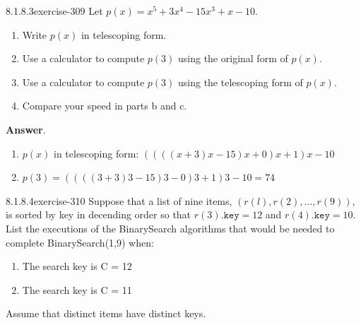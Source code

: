 \documentclass[twoside,10pt,]{book}
\numberwithin{equation}{section}
\begin{document}
\begin{divisionsolution}{8.1.8.3}{}{exercise-309}%
\hypertarget{p-2568}{}%
Let \(p(x) = x^5+ 3x^4 - 15x^3 + x - 10\).%
\par
\hypertarget{p-2569}{}%
\leavevmode%
\begin{enumerate}[label=(\alph*)]
\item\hypertarget{li-1282}{}\hypertarget{p-2570}{}%
Write \(p(x)\) in telescoping form.%
\item\hypertarget{li-1283}{}\hypertarget{p-2571}{}%
Use a calculator to compute \(p(3)\) using the original form of \(p(x)\).%
\item\hypertarget{li-1284}{}\hypertarget{p-2572}{}%
Use a calculator to compute \(p(3)\) using the telescoping form of \(p(x)\).%
\item\hypertarget{li-1285}{}\hypertarget{p-2573}{}%
Compare your speed in parts b and c.%
\end{enumerate}
%
\par\smallskip%
\noindent\textbf{Answer}.\quad%
\hypertarget{p-2574}{}%
\leavevmode%
\begin{enumerate}[label=(\alph*)]
\item\hypertarget{li-1286}{}\hypertarget{p-2575}{}%
\(p(x)\) in telescoping form: \(((((x+3)x-15)x+0)x+1)x-10\)%
\item\hypertarget{li-1287}{}\hypertarget{p-2576}{}%
\(p(3)=((((3+3)3-15)3-0)3+1)3-10=74\)%
\end{enumerate}
%
\end{divisionsolution}%
\begin{divisionsolution}{8.1.8.4}{}{exercise-310}%
\hypertarget{p-2577}{}%
Suppose that a list of nine items, \((r(l), r(2), . . . , r(9))\), is sorted by key in decending order so that \(r(3).\texttt{key} = 12\) and \(r(4).\texttt{key} = 10\). List the executions of the BinarySearch algorithms that would be needed to complete BinarySearch(1,9) when:\leavevmode%
\begin{multicols}{2}
\begin{enumerate}[label=(\alph*)]
\item\hypertarget{li-1288}{}\hypertarget{p-2578}{}%
The search key is C = 12%
\item\hypertarget{li-1289}{}\hypertarget{p-2579}{}%
The search key is C = 11%
\end{enumerate}
\end{multicols}
%
\par
\hypertarget{p-2580}{}%
Assume that distinct items have distinct keys.%
\end{divisionsolution}%
\end{document}
